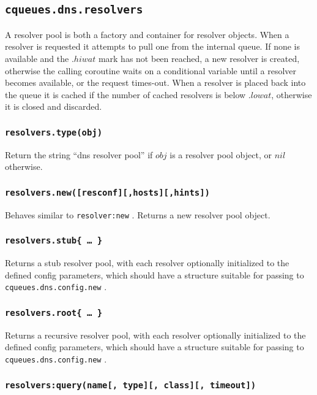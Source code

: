 \documentclass[11pt, oneside]{memoir}
\newcommand{\routine}[1]{\texttt{#1} }
\newcommand{\fn}[1]{\texttt{#1} }
\newcounter{toccols}
\newenvironment{Module}[1]{
	\subsection{\texttt{#1}}
	\addtocontents{toc}{
		\protect\begin{multicols}{\value{toccols}}
	}
}{
	\addtocontents{toc}{\protect\end{multicols}}
}
\begin{document}
\begin{Module}{cqueues.dns.resolvers}

A resolver pool is both a factory and container for resolver objects. When a resolver is requested it attempts to pull one from the internal queue. If none is available and the $.hiwat$ mark has not been reached, a new resolver is created, otherwise the calling coroutine waits on a conditional variable until a resolver becomes available, or the request times-out. When a resolver is placed back into the queue it is cached if the number of cached resolvers is below $.lowat$, otherwise it is closed and discarded.

\subsubsection[\routine{resolvers.type}]{\routine{resolvers.type(obj)}}
Return the string ``dns resolver pool'' if $obj$ is a resolver pool object, or $nil$ otherwise.

\subsubsection[\fn{resolvers.new}]{\fn{resolvers.new([resconf][,hosts][,hints])}}

Behaves similar to \fn{resolver:new}. Returns a new resolver pool object.

\subsubsection[\fn{resolvers.stub}]{\fn{resolvers.stub\{ … \}}}

Returns a stub resolver pool, with each resolver optionally initialized to the defined config parameters, which should have a structure suitable for passing to \fn{cqueues.dns.config.new}.

\subsubsection[\fn{resolvers.root}]{\fn{resolvers.root\{ … \}}}

Returns a recursive resolver pool, with each resolver optionally initialized to the defined config parameters, which should have a structure suitable for passing to \fn{cqueues.dns.config.new}.

\subsubsection[\fn{resolvers:query}]{\fn{resolvers:query(name[, type][, class][, timeout])}}


\end{Module}
\end{document}
